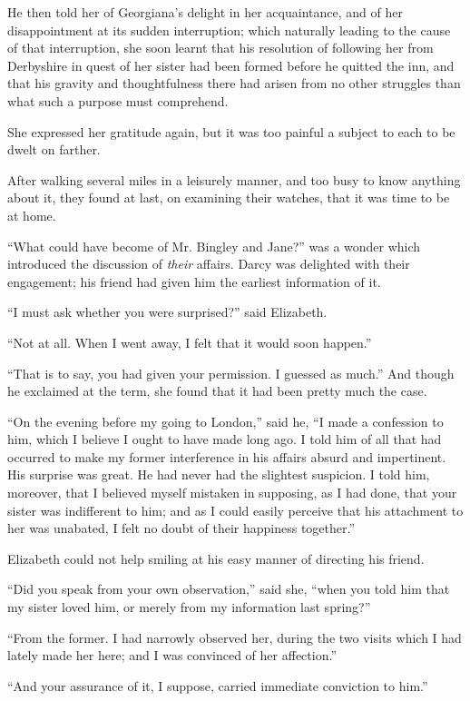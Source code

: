 He then told her of Georgiana's delight in her acquaintance, and of her disappointment at its sudden interruption; which naturally leading to the cause of that interruption, she soon learnt that his resolution of following her from Derbyshire in quest of her sister had been formed before he quitted the inn, and that his gravity and thoughtfulness there had arisen from no other struggles than what such a purpose must comprehend.

She expressed her gratitude again, but it was too painful a subject to each to be dwelt on farther.

After walking several miles in a leisurely manner, and too busy to know anything about it, they found at last, on examining their watches, that it was time to be at home.

``What could have become of Mr. Bingley and Jane?'' was a wonder which introduced the discussion of \textit{their} affairs. Darcy was delighted with their engagement; his friend had given him the earliest information of it.

``I must ask whether you were surprised?'' said Elizabeth.

``Not at all. When I went away, I felt that it would soon happen.''

``That is to say, you had given your permission. I guessed as much.'' And though he exclaimed at the term, she found that it had been pretty much the case.

``On the evening before my going to London,'' said he, ``I made a confession to him, which I believe I ought to have made long ago. I told him of all that had occurred to make my former interference in his affairs absurd and impertinent. His surprise was great. He had never had the slightest suspicion. I told him, moreover, that I believed myself mistaken in supposing, as I had done, that your sister was indifferent to him; and as I could easily perceive that his attachment to her was unabated, I felt no doubt of their happiness together.''

Elizabeth could not help smiling at his easy manner of directing his friend.

``Did you speak from your own observation,'' said she, ``when you told him that my sister loved him, or merely from my information last spring?''

``From the former. I had narrowly observed her, during the two visits which I had lately made her here; and I was convinced of her affection.''

``And your assurance of it, I suppose, carried immediate conviction to him.''

